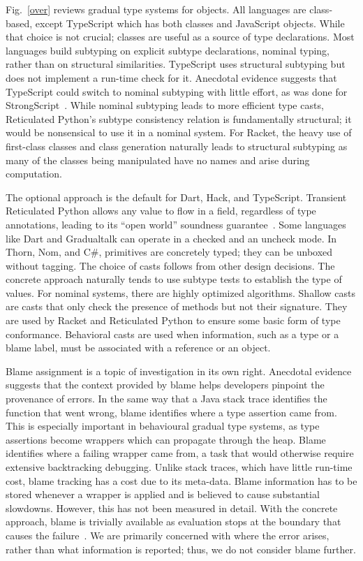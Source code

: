 \documentclass[a4paper,USenglish]{lipics-v2018}
\newcommand{\figref}[1]{Fig.~\ref{#1}\xspace}
\newcounter{lem}
\begin{document}
\figref{over} reviews gradual type systems for objects. All languages are
class-based, except TypeScript which has both classes and JavaScript
objects. While that choice is not crucial; classes are useful as a source of
type declarations. Most languages build subtyping on explicit subtype
declarations, nominal typing, rather than on structural similarities.
TypeScript uses structural subtyping but does not implement a run-time
check for it. Anecdotal evidence suggests that TypeScript could switch
to nominal subtyping with little effort, as was done for
StrongScript~\cite{ecoop15}. While nominal subtyping leads to more
efficient type casts, Reticulated Python's subtype consistency relation is
fundamentally structural; it would be nonsensical to use it in a nominal
system. For Racket, the heavy use of first-class classes and class
generation naturally leads to structural subtyping as many of the classes
being manipulated have no names and arise during computation.

The optional approach is the default for Dart, Hack, and TypeScript.
Transient Reticulated Python allows any value to flow in a field, regardless
of type annotations, leading to its ``open world'' soundness
guarantee~\cite{siek14}. Some languages like Dart and Gradualtalk can
operate in a checked and an uncheck mode. In Thorn, Nom, and C\#, primitives
are concretely typed; they can be unboxed without tagging. The choice of
casts follows from other design decisions. The concrete approach naturally
tends to use subtype tests to establish the type of values. For nominal
systems, there are highly optimized algorithms. Shallow casts are casts that
only check the presence of methods but not their signature. They are used
by Racket and Reticulated Python to ensure some basic form of type
conformance. Behavioral casts are used when information, such as a type or a
blame label, must be associated with a reference or an object.

Blame assignment is a topic of investigation in its own right. Anecdotal
evidence suggests that the context provided by blame helps developers
pinpoint the provenance of errors. In the same way that a Java stack trace
identifies the function that went wrong, blame identifies where a type
assertion came from. This is especially important in behavioural gradual
type systems, as type assertions become wrappers which can propagate through
the heap. Blame identifies where a failing wrapper came from, a task that
would otherwise require extensive backtracking debugging. Unlike stack
traces, which have little run-time cost, blame tracking has a cost due to
its meta-data. Blame information has to be stored whenever a wrapper is
applied and is believed to cause substantial slowdowns. However, this has
not been measured in detail. With the concrete approach, blame is trivially
available as evaluation stops at the boundary that causes the
failure~\cite{Muehlboeck2017}. We are primarily concerned with where the
error arises, rather than what information is reported; thus, we
do not consider blame further.
\end{document}
